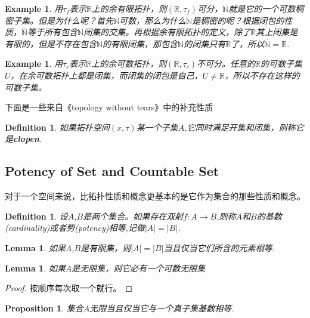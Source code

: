 \documentclass{article}
\newtheorem{lemma}[theorem]{Lemma}
\newtheorem{proposition}[theorem]{Proposition}
\newtheorem{example}[theorem]{Example}
\newtheorem{definition}[theorem]{Definition}
\newcommand*{\xfunc}[4]{{#2}\colon{#3}{#1}{#4}}
\newcommand*{\func}[3]{\xfunc{\to}{#1}{#2}{#3}}
\begin{document}
\begin{example}
用$\tau_f$表示$\mathbb{R}$上的余有限拓扑，则$(\mathbb{R},\tau_f)$可分，$\mathbb{N}$就是它的一个可数稠密子集。但是为什么呢？首先$\mathbb{N}$可数，那么为什么$\mathbb{N}$是稠密的呢？根据闭包的性质，$\overline{\mathbb{N}}$等于所有包含$\mathbb{N}$闭集的交集。再根据余有限拓扑的定义，除了$\mathbb{R}$其上闭集是有限的，但是不存在包含$\mathbb{N}$的有限闭集，那包含$\mathbb{N}$的闭集只有$\mathbb{R}$了，所以$\overline{\mathbb{N}}=\mathbb{R}$.
\end{example}

\begin{example}
用$\tau_c$表示$\mathbb{R}$上的余可数拓扑，则$(\mathbb{R},\tau_c)$不可分。任意的$\mathbb{R}$的可数子集$U$，在余可数拓扑上都是闭集，而闭集的闭包是自己，$U \neq \mathbb{R}$，所以不存在这样的可数子集。
\end{example}

下面是一些来自《topology without tears》中的补充性质

\begin{definition}
如果拓扑空间$(x,\tau)$某一个子集$A$,它同时满足开集和闭集，则称它是\textbf{clopen}.
\end{definition}

\newpage
\subsection{Potency of Set and Countable Set}

对于一个空间来说，比拓扑性质和概念更基本的是它作为集合的那些性质和概念。

\begin{definition}
设$A$,$B$是两个集合。如果存在双射$\func{f}{A}{B}$,则称$A$和$B$的基数(cardinality)或者势(potency)相等,记做$|A|=|B|$.
\end{definition}

\begin{lemma}
如果$A$,$B$是有限集，则$|A|=|B|$当且仅当它们所含的元素相等.
\end{lemma}

\begin{lemma}
如果$A$是无限集，则它必有一个可数无限集
\end{lemma}

\begin{proof}
按顺序每次取一个就行。
\end{proof}

\begin{proposition}
集合$A$无限当且仅当它与一个真子集基数相等.
\end{proposition}
\end{document}
